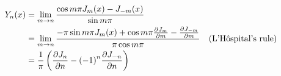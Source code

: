 \item

\begin{align*}
    Y_n(x)
    &= \lim_{m \rightarrow n} \frac{
        \cos m\pi J_m(x) - J_{-m}(x)
    }{\sin m\pi} \\
    &= \lim_{m \rightarrow n} \frac{
        - \pi\sin m\pi J_m(x)
        + \cos m\pi \frac{\partial J_m}{\partial m}
        - \frac{\partial J_{-m}}{\partial m}
    }{\pi\cos m\pi}
    && (\text{L'H\^ospital's rule}) \\
    &= \frac{1}{\pi} \left(
        \frac{\partial J_n}{\partial n}
        - {(-1)}^n \frac{\partial J_{-n}}{\partial n}
    \right)
\end{align*}